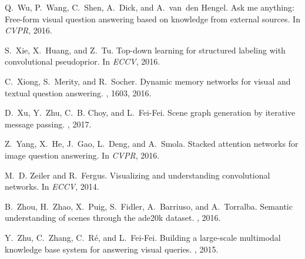 \documentclass[10pt,twocolumn,letterpaper]{article}
\begin{document}
{\begin{thebibliography}{10}
Q.~Wu, P.~Wang, C.~Shen, A.~Dick, and A.~van~den Hengel.
\newblock Ask me anything: Free-form visual question answering based on
  knowledge from external sources.
\newblock In {\em CVPR}, 2016.

S.~Xie, X.~Huang, and Z.~Tu.
\newblock Top-down learning for structured labeling with convolutional
  pseudoprior.
\newblock In {\em ECCV}, 2016.

C.~Xiong, S.~Merity, and R.~Socher.
\newblock Dynamic memory networks for visual and textual question answering.
, 1603, 2016.

D.~Xu, Y.~Zhu, C.~B. Choy, and L.~Fei-Fei.
\newblock Scene graph generation by iterative message passing.
, 2017.

Z.~Yang, X.~He, J.~Gao, L.~Deng, and A.~Smola.
\newblock Stacked attention networks for image question answering.
\newblock In {\em CVPR}, 2016.

M.~D. Zeiler and R.~Fergus.
\newblock Visualizing and understanding convolutional networks.
\newblock In {\em ECCV}, 2014.

B.~Zhou, H.~Zhao, X.~Puig, S.~Fidler, A.~Barriuso, and A.~Torralba.
\newblock Semantic understanding of scenes through the ade20k dataset.
, 2016.

Y.~Zhu, C.~Zhang, C.~R{\'e}, and L.~Fei-Fei.
\newblock Building a large-scale multimodal knowledge base system for answering
  visual queries.
, 2015.

\end{thebibliography}
}
\end{document}
